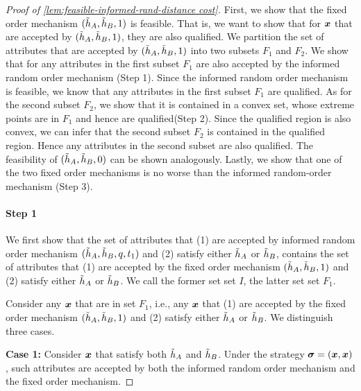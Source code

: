\begin{proof}[Proof of \cref{lem:feasible-informed-rand-distance cost}]
First, we  show that the fixed order mechanism $(\tilde{h}_A,\tilde{h}_B,1)$ is feasible.
That is, we want to show that for $\boldsymbol{x}$ that are accepted by $(\tilde{h}_A,\tilde{h}_B,1)$, they are also qualified.
We partition the set of attributes that are accepted by $(\tilde{h}_A,\tilde{h}_B,1)$ into two subsets $F_1$ and $F_2$. 
We show that for any attributes in the first subset $F_1$ are also accepted by the informed random order mechanism (Step 1).
Since the informed random order mechanism is feasible, we know that any attributes in the first subset $F_1$ are qualified.
As for the second subset $F_2$, we show that it is contained in a convex set, whose extreme points are in $F_1$ and hence are qualified(Step 2).
Since the qualified region is also convex, we can infer that the second subset $F_2$ is contained in the qualified region.
Hence any attributes in the second subset are also qualified.
The feasibility of $(\tilde{h}_A,\tilde{h}_B,0)$ can be shown analogously.
Lastly, we show that one of the two fixed order mechanisms is no worse than the informed random-order mechanism (Step 3).


\paragraph{Step 1} We first show that the set of attributes that (1) are accepted by informed random order mechanism  $(\tilde{h}_A,\tilde{h}_B,q,t_1)$ and (2) satisfy either $\tilde{h}_A$ or $\tilde{h}_B$, contains the set of attributes that (1) are accepted by the fixed order mechanism  $(\tilde{h}_A,\tilde{h}_B,1)$ and (2) satisfy either $\tilde{h}_A$ or $\tilde{h}_B$.
We call the former set set $I$, the latter set set $F_1$.

Consider any $\boldsymbol{x}$ that are in set $F_1$, i.e.,  any $\boldsymbol{x}$ that (1) are accepted by the fixed order mechanism  $(\tilde{h}_A,\tilde{h}_B,1)$ and (2) satisfy either $\tilde{h}_A$ or $\tilde{h}_B$.
We distinguish three cases.

\textbf{Case 1:} Consider $\boldsymbol{x}$ that satisfy both $\tilde{h}_A$ and $\tilde{h}_B$.
Under the strategy $\boldsymbol{\sigma}=(\boldsymbol{x},\boldsymbol{x})$, 
such attributes are accepted by both the informed random order mechanism and the fixed order mechanism.


\end{proof}
